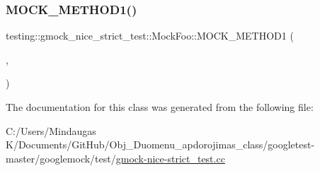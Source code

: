 \subsubsection{\texorpdfstring{MOCK\_METHOD1()}{MOCK\_METHOD1()}\hspace{0.1cm}{\footnotesize\ttfamily [3/3]}}
{\footnotesize\ttfamily testing\+::gmock\+\_\+nice\+\_\+strict\+\_\+test\+::\+Mock\+Foo\+::\+M\+O\+C\+K\+\_\+\+M\+E\+T\+H\+O\+D1 (\begin{DoxyParamCaption}\item[{\mbox{\hyperlink{classtesting_1_1gmock__nice__strict__test_1_1_foo_a8527a459b03f333a809a3376311a9f8b}{Do\+That}}}]{,  }\item[{int(bool flag)}]{ }\end{DoxyParamCaption})}



The documentation for this class was generated from the following file\+:\begin{DoxyCompactItemize}
\item 
C\+:/\+Users/\+Mindaugas K/\+Documents/\+Git\+Hub/\+Obj\+\_\+\+Duomenu\+\_\+apdorojimas\+\_\+class/googletest-\/master/googlemock/test/\mbox{\hyperlink{googletest-master_2googlemock_2test_2gmock-nice-strict__test_8cc}{gmock-\/nice-\/strict\+\_\+test.\+cc}}\end{DoxyCompactItemize}
